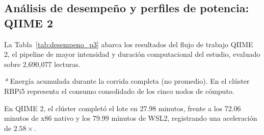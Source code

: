 \documentclass[12pt,oneside,spanish]{book}
\begin{document}
    \subsection{Análisis de desempeño y perfiles de potencia: QIIME 2}
    
    La Tabla~\ref{tab:desempeno_p3} abarca los resultados del flujo de trabajo QIIME 2, el pipeline de mayor intensidad y duración computacional del estudio, evaluado sobre 2,690,077 lecturas.
    
    \begin{table}[htbp]
    \centering
    \caption{Métricas de desempeño computacional y energético: QIIME 2 (5 muestras, 2,690,077 lecturas, protocolo 5~min de reposo basal).}
    \label{tab:desempeno_p3}
    \footnotesize
    \setlength{\tabcolsep}{4.5pt}
    
    \vspace{1.5mm}
    \parbox{\textwidth}{\footnotesize \textit{*} Energía acumulada durante la corrida completa (no promedio). En el clúster RBPi5 representa el consumo consolidado de los cinco nodos de cómputo.}
    \end{table}

    
     En QIIME 2, el clúster completó el lote en 27.98 minutos, frente a los 72.06 minutos de x86 nativo y los 79.99 minutos de WSL2, registrando una aceleración de $2.58\times$.
    
\end{document}
